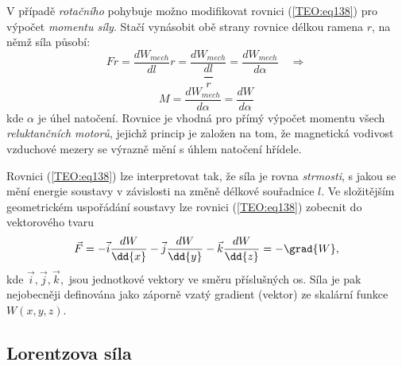       V	případě \emph{rotačního} pohybuje možno modifikovat rovnici (\ref{TEO:eq138}) pro 
      výpočet \emph{momentu síly}. Stačí vynásobit obě strany rovnice délkou ramena \(r\), na němž 
      síla působí:
      \begin{equation*}
        Fr = \frac{dW_{mech}}{dl}r 
           = \frac{dW_{mech}}{\dfrac{dl}{r}} 
           = \frac{dW_{mech}}{d\alpha}
             \quad \Longrightarrow
      \end{equation*}
      \begin{equation*}
        \boxed{M = \frac{dW_{mech}}{d\alpha} = \frac{dW}{d\alpha}}
      \end{equation*}
      kde \(\alpha\) je úhel natočení. Rovnice je vhodná pro přímý výpočet momentu všech
      \emph{reluktančních motorů}, jejichž princip je založen na tom, že magnetická vodivost
      vzduchové mezery se výrazně mění s úhlem natočení hřídele.
      
      Rovnici (\ref{TEO:eq138}) lze interpretovat tak, že síla je rovna \emph{strmosti}, s jakou se
      mění energie soustavy v závislosti na změně délkové souřadnice \(l\). Ve složitějším
      geometrickém uspořádání soustavy lze rovnici (\ref{TEO:eq138}) zobecnit do vektorového tvaru
      \begin{equation*}
       \vec{F} = -\vec{i}\frac{dW}{\dd{x}} -\vec{j}\frac{dW}{\dd{y}} -\vec{k}\frac{dW}{\dd{z}} 
               = - \grad{W},
      \end{equation*}
      kde \(\vec{i}, \vec{j}, \vec{k},\) jsou jednotkové vektory ve směru příslušných os. Síla je
      pak nejobecněji definována jako záporně vzatý gradient (vektor) ze skalární funkce
      \(W(x,y,z)\).
      
    \subsection{Lorentzova síla}
      
